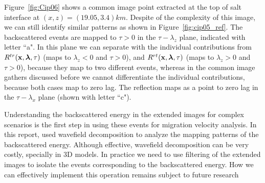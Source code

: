 Figure~\ref{fig:Cip06} shows a common image point extracted at the top of salt interface at $(x,z)=(19.05,3.4)km$. Despite of the complexity of this image, we can still
identify similar patterns as shown in Figure~\ref{fig:cip05_ref}. The backscattered events are mapped to $\tau>0$ in the
$\tau-\lambda_z$ plane, indicated with letter ``a". In this plane we can separate with the individual contributions 
from $R^{tr}({\bf x},{\boldsymbol{\lambda}},\tau)$ (maps to $\lambda_z<0$ and $\tau>0$), and $R^{rt}({\bf x},{\boldsymbol{\lambda}},\tau)$ (maps to $\lambda_z>0$ and $\tau>0$), because they map to two different events, 
whereas in the common image gathers discussed before we cannot differentiate the individual
contributions, because both cases map to zero lag. The reflection maps as a point to zero lag in the $\tau-\lambda_x$ plane (shown with letter ``c"). 

Understanding the backscattered energy in the extended images for complex scenarios is the first step in using these events for 
migration velocity analysis. In this report, used wavefield decomposition to analyze the mapping patterns of the backscattered energy. Although effective, wavefield
decomposition can be very costly, specially in 3D models. In practice we need to use filtering of the extended images to isolate the events corresponding to 
the backscattered energy. How we can effectively  implement this operation remains subject to future research





